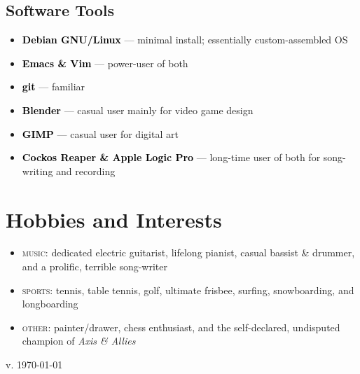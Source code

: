 \message{ !name(symonds_resume.tex)}\documentclass[10pt, a4paper]{article}
\newcommand{\point}[1]{\textcolor{black}{\textbf{#1}}}
\newcommand\pitem[1]{\item{\point{#1} ---}}
\newenvironment{brag}{
\renewcommand{\labelitemi}{\color{black}$\diamond$}
\vspace{-0.5em}
\begin{itemize}\color{fade}
\setlength\itemsep{0.2em}
}{\end{itemize}}
\newenvironment{exper}{
\renewcommand{\labelitemi}{$\diamond$}
\vspace{-1.5em}\begin{itemize}
\setlength\itemsep{-0.2em}
}{\end{itemize}}
\begin{document}
\begin{multicols}{2}
\subsection{Software Tools}
\begin{brag}
\pitem{Debian GNU/Linux}
minimal install; essentially custom-assembled OS
\pitem{Emacs \& Vim}
power-user of both
\pitem{git}
familiar

\pitem{Blender}
casual user mainly for video game design
\pitem{GIMP}
casual user for digital art
\pitem{Cockos Reaper \& Apple Logic Pro}
long-time user of both for song-writing and recording
\end{brag}
\end{multicols}

\section{Hobbies and Interests}
\vspace{1em}
\begin{exper}
\item \textsc{music:} dedicated electric guitarist, lifelong pianist, casual bassist \& drummer, and a prolific, terrible song-writer
\item \textsc{sports:} tennis, table tennis, golf, ultimate frisbee, surfing, snowboarding, and longboarding
\item \textsc{other:} painter/drawer, chess enthusiast, and the self-declared, undisputed champion of \textit{Axis \& Allies}
\end{exper}


 \vspace{\fill} \textcolor{fade}{\small{\hfill v. \today}}
\end{document}
